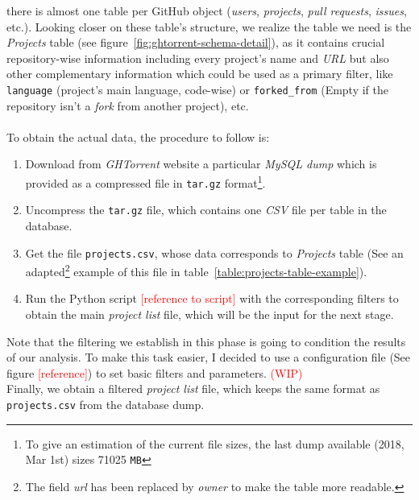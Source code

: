 \documentclass[a4paper, 12pt]{book}
\begin{document}
there is almost one table per GitHub object (\textit{users}, \textit{projects}, \textit{pull requests}, \textit{issues}, etc.).
Looking closer on these table's structure, we realize the table we need is the \emph{Projects} table
(see figure~\ref{fig:ghtorrent-schema-detail}), as it contains crucial repository-wise information including every project's name
and \textit{URL} but also other complementary information which could be used as a primary filter, like \texttt{language} (project's main language,
code-wise) or \texttt{forked\_from} (Empty if the repository isn't a \textit{fork} from another project), etc.\\\\
To obtain the actual data, the procedure to follow is:
\begin{enumerate}
  \item Download from \emph{GHTorrent} website a particular \emph{MySQL dump} which is provided as a compressed file in \texttt{tar.gz}
        format\footnote{To give an estimation of the current file sizes, the last dump available (2018, Mar 1st) sizes 71025 \texttt{MB}}.
  \item Uncompress the \texttt{tar.gz} file, which contains one \emph{CSV} file per table in the database.
  \item Get the file \texttt{projects.csv}, whose data corresponds to \emph{Projects} table (See an adapted\footnote{The field \emph{url} has been replaced by \emph{owner} to make the table more readable.}
  example of this file in table~\ref{table:projects-table-example}).
  \item Run the Python script \textcolor{red}{[reference to script]} with the corresponding filters to obtain the main
        \emph{project list} file, which will be the input for the next stage.
\end{enumerate}
Note that the filtering we establish in this phase is going to condition the results of our analysis. To make this task easier,
I decided to use a configuration file (See figure \textcolor{red}{[reference]}) to set basic filters and parameters. \textcolor{red}{(WIP)}\\
Finally, we obtain a filtered \emph{project list} file, which keeps the same format as \texttt{projects.csv} from the database dump.
\end{document}
